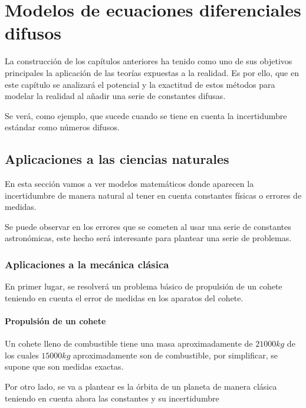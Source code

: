 
\chapter{Modelos de ecuaciones diferenciales difusos}
La construcción de los capítulos anteriores ha tenido como uno de sus objetivos principales la aplicación de las teorías expuestas a la realidad. Es por ello, que en este capítulo se analizará el potencial y la exactitud de estos métodos para modelar la realidad al añadir una serie de constantes difusas.

Se verá, como ejemplo, que sucede cuando se tiene en cuenta la incertidumbre estándar como números difusos.

\section{Aplicaciones a las ciencias naturales}

En esta sección vamos a ver modelos matemáticos donde aparecen la incertidumbre de manera natural al tener en cuenta constantes físicas o errores de medidas. 

Se puede observar en \cite{nasa} los errores que se cometen al usar una serie de constantes astronómicas, este hecho será interesante para plantear una serie de problemas.
\subsection{Aplicaciones a la mecánica clásica}
En primer lugar, se resolverá un problema básico de propulsión de un cohete teniendo en cuenta el error de medidas en los aparatos del cohete.
\subsubsection{Propulsión de un cohete}

\begin{ejemplo}
	Un cohete lleno de combustible tiene una masa aproximadamente de $21000kg$ de los cuales $15000kg$ aproximadamente son de combustible, por simplificar, se supone que son medidas exactas.
\end{ejemplo}
Por otro lado, se va a plantear es la órbita de un planeta de manera clásica teniendo en cuenta ahora las constantes y su incertidumbre

